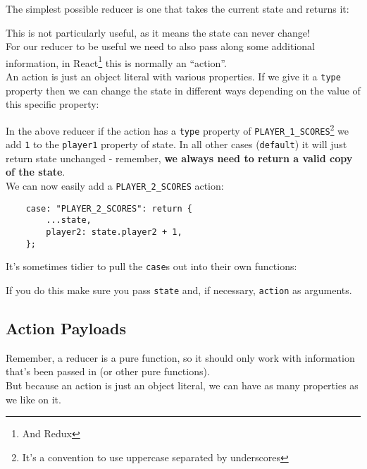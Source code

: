 The simplest possible reducer is one that takes the current state and returns it:


This is not particularly useful, as it means the state can never change!
\\

For our reducer to be useful we need to also pass along some additional information, in React\footnote{And Redux} this is normally an ``action''.
\\

An action is just an object literal with various properties. If we give it a \texttt{type} property then we can change the state in different ways depending on the value of this specific property:


In the above reducer if the action has a \texttt{type} property of \texttt{PLAYER\_1\_SCORES}\footnote{It's a convention to use uppercase separated by underscores} we add \texttt{1} to the \texttt{player1} property of state. In all other cases (\texttt{default}) it will just return state unchanged - remember, \textbf{we always need to return a valid copy of the state}.
\\

We can now easily add a \texttt{PLAYER\_2\_SCORES} action:

\begin{verbatim}
    case: "PLAYER_2_SCORES": return {
        ...state,
        player2: state.player2 + 1,
    };
\end{verbatim}

It's sometimes tidier to pull the \texttt{case}s out into their own functions:


If you do this make sure you pass \texttt{state} and, if necessary, \texttt{action} as arguments.


\subsection{Action Payloads}

Remember, a reducer is a pure function, so it should only work with information that's been passed in (or other pure functions).
\\

But because an action is just an object literal, we can have as many properties as we like on it.
\\

